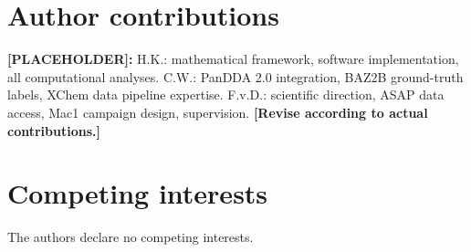 \documentclass[10pt,twocolumn]{article}
\newcommand{\placeholder}[1]{%
  \begin{mdframed}[
    linecolor=placeholder,linewidth=1pt,
    backgroundcolor=red!5,
    innertopmargin=6pt,innerbottommargin=6pt,
    innerleftmargin=8pt,innerrightmargin=8pt]
  \small\color{placeholder}\textbf{[PLACEHOLDER]:} #1
  \end{mdframed}
}
\begin{document}
\section*{Author contributions}

\placeholder{
H.K.: mathematical framework, software implementation,
all computational analyses.
C.W.: PanDDA 2.0 integration, BAZ2B ground-truth labels,
XChem data pipeline expertise.
F.v.D.: scientific direction, ASAP data access, Mac1 campaign
design, supervision.
\textbf{[Revise according to actual contributions.]}
}

\section*{Competing interests}

The authors declare no competing interests.


\end{document}
